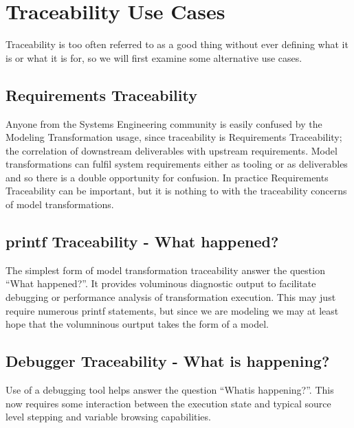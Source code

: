 \documentclass[runningheads,a4paper]{llncs}
\begin{document}

\section{Traceability Use Cases}\label{use cases}

Traceability is too often referred to as a good thing without ever defining what it is or what it is for, so we will first examine some alternative use cases.

\subsection{Requirements Traceability}

Anyone from the Systems Engineering community is easily confused by the Modeling Transformation usage, since traceability is Requirements Traceability; the correlation of downstream deliverables with upstream requirements. Model transformations can fulfil system requirements either as tooling or as deliverables and so there is a double opportunity for confusion. In practice Requirements Traceability can be important, but it is nothing to with the traceability concerns of model transformations.

\subsection{printf Traceability - What happened?}

The simplest form of model transformation traceability answer the question ``What happened?''. It provides voluminous diagnostic output to facilitate debugging or performance analysis of transformation execution. This may just require numerous printf statements, but since we are modeling we may at least hope that the volumninous ourtput takes the form of a model. 

\subsection{Debugger Traceability - What is happening?}

Use of a debugging tool helps answer the  question ``Whatis  happening?''. This now requires some interaction between the execution state and typical source level stepping and variable browsing capabilities.
\end{document}
